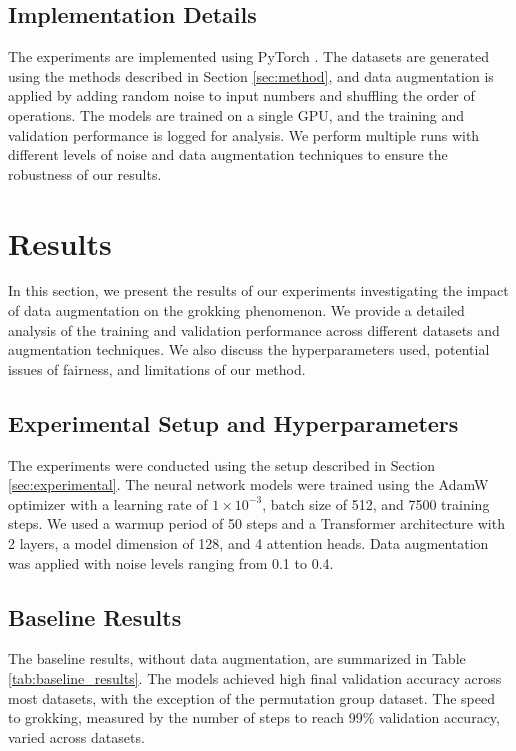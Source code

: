 \documentclass{article} %
\begin{document}
\subsection{Implementation Details}
The experiments are implemented using PyTorch \citep{paszke2019pytorch}. The datasets are generated using the methods described in Section \ref{sec:method}, and data augmentation is applied by adding random noise to input numbers and shuffling the order of operations. The models are trained on a single GPU, and the training and validation performance is logged for analysis. We perform multiple runs with different levels of noise and data augmentation techniques to ensure the robustness of our results.

\section{Results}
\label{sec:results}

In this section, we present the results of our experiments investigating the impact of data augmentation on the grokking phenomenon. We provide a detailed analysis of the training and validation performance across different datasets and augmentation techniques. We also discuss the hyperparameters used, potential issues of fairness, and limitations of our method.

\subsection{Experimental Setup and Hyperparameters}
The experiments were conducted using the setup described in Section \ref{sec:experimental}. The neural network models were trained using the AdamW optimizer \citep{loshchilov2017adamw} with a learning rate of \(1 \times 10^{-3}\), batch size of 512, and 7500 training steps. We used a warmup period of 50 steps and a Transformer architecture with 2 layers, a model dimension of 128, and 4 attention heads. Data augmentation was applied with noise levels ranging from 0.1 to 0.4.

\subsection{Baseline Results}
The baseline results, without data augmentation, are summarized in Table \ref{tab:baseline_results}. The models achieved high final validation accuracy across most datasets, with the exception of the permutation group dataset. The speed to grokking, measured by the number of steps to reach 99\% validation accuracy, varied across datasets.
\end{document}

